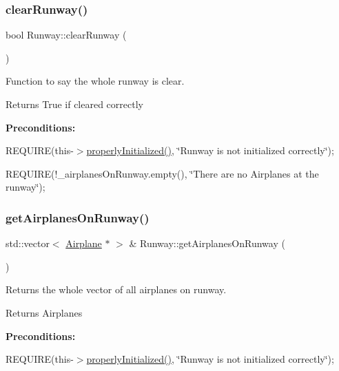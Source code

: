 \subsubsection{\texorpdfstring{clear\+Runway()}{clearRunway()}}
{\footnotesize\ttfamily bool Runway\+::clear\+Runway (\begin{DoxyParamCaption}{ }\end{DoxyParamCaption})}



Function to say the whole runway is clear. 

\begin{DoxyReturn}{Returns}
True if cleared correctly
\end{DoxyReturn}
{\bfseries Preconditions\+:}
\begin{DoxyItemize}
\item R\+E\+Q\+U\+I\+RE(this-\/$>$\mbox{\hyperlink{class_runway_a360d98246cabf3aa929765f81a656348}{properly\+Initialized()}}, \char`\"{}\+Runway is not initialized correctly\char`\"{});
\item R\+E\+Q\+U\+I\+RE(!\+\_\+airplanes\+On\+Runway.empty(), \char`\"{}\+There are no Airplanes at the runway\char`\"{}); 
\end{DoxyItemize}\mbox{\label{class_runway_a5e44b199b4e267f41b6e9710a519e720}} 
\subsubsection{\texorpdfstring{get\+Airplanes\+On\+Runway()}{getAirplanesOnRunway()}}
{\footnotesize\ttfamily std\+::vector$<$ \mbox{\hyperlink{class_airplane}{Airplane}} $\ast$ $>$ \& Runway\+::get\+Airplanes\+On\+Runway (\begin{DoxyParamCaption}{ }\end{DoxyParamCaption})}



Returns the whole vector of all airplanes on runway. 

\begin{DoxyReturn}{Returns}
Airplanes
\end{DoxyReturn}
{\bfseries Preconditions\+:}
\begin{DoxyItemize}
\item R\+E\+Q\+U\+I\+RE(this-\/$>$\mbox{\hyperlink{class_runway_a360d98246cabf3aa929765f81a656348}{properly\+Initialized()}}, \char`\"{}\+Runway is not initialized correctly\char`\"{}); 
\end{DoxyItemize}\mbox{\label{class_runway_ac6d84fd93863115c2b96912b4432d76e}} 
